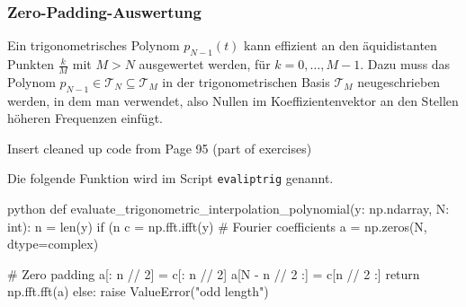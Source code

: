 
\newpage
\subsubsection{Zero-Padding-Auswertung}
Ein trigonometrisches Polynom $p_{N - 1}(t)$ kann effizient an den äquidistanten Punkten $\frac{k}{M}$ mit $M > N$ ausgewertet werden, für $k = 0, \ldots, M - 1$.
Dazu muss das Polynom $p_{N - 1} \in \mathcal{T}_N \subseteq \mathcal{T}_M$ in der trigonometrischen Basis $\mathcal{T}_M$ neugeschrieben werden,
in dem man  verwendet, also Nullen im Koeffizientenvektor an den Stellen höheren Frequenzen einfügt.

\TODO Insert cleaned up code from Page 95 (part of exercises)

Die folgende Funktion wird im Script \texttt{evaliptrig} genannt.
\rmvspace
\begin{code}{python}
    def evaluate_trigonometric_interpolation_polynomial(y: np.ndarray, N: int):
        n = len(y)
        if (n %
            c = np.fft.ifft(y)  # Fourier coefficients
            a = np.zeros(N, dtype=complex)

            # Zero padding
            a[: n // 2] = c[: n // 2]
            a[N - n // 2 :] = c[n // 2 :]
            return np.fft.fft(a)
        else:
            raise ValueError("odd length")
\end{code}
